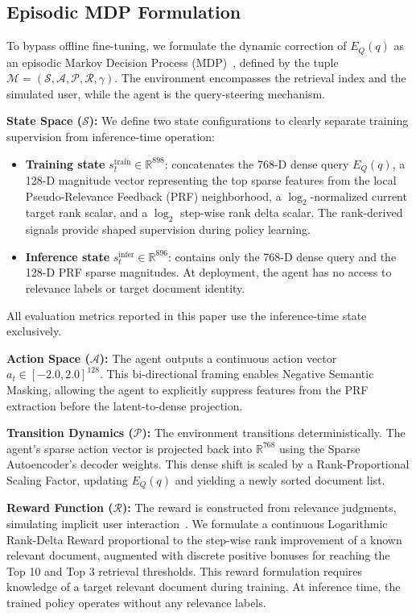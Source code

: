 \documentclass[sigconf]{acmart}
\begin{document}
\subsection{Episodic MDP Formulation}

To bypass offline fine-tuning, we formulate the dynamic correction of $E_Q(q)$ as an episodic Markov Decision Process (MDP)~\cite{sutton2018}, defined by the tuple $\mathcal{M} = (\mathcal{S}, \mathcal{A}, \mathcal{P}, \mathcal{R}, \gamma)$. The environment encompasses the retrieval index and the simulated user, while the agent is the query-steering mechanism.

\textbf{State Space ($\mathcal{S}$):} We define two state configurations to clearly separate training supervision from inference-time operation:

\begin{itemize}
\item \textbf{Training state} $s_t^{\text{train}} \in \mathbb{R}^{898}$: concatenates the 768-D dense query $E_Q(q)$, a 128-D magnitude vector representing the top sparse features from the local Pseudo-Relevance Feedback (PRF) neighborhood, a $\log_2$-normalized current target rank scalar, and a $\log_2$ step-wise rank delta scalar. The rank-derived signals provide shaped supervision during policy learning.
\item \textbf{Inference state} $s_t^{\text{infer}} \in \mathbb{R}^{896}$: contains only the 768-D dense query and the 128-D PRF sparse magnitudes. At deployment, the agent has no access to relevance labels or target document identity.
\end{itemize}

All evaluation metrics reported in this paper use the inference-time state exclusively.

\textbf{Action Space ($\mathcal{A}$):} The agent outputs a continuous action vector $a_t \in [-2.0, 2.0]^{128}$. This bi-directional framing enables Negative Semantic Masking, allowing the agent to explicitly suppress features from the PRF extraction before the latent-to-dense projection.

\textbf{Transition Dynamics ($\mathcal{P}$):} The environment transitions deterministically. The agent's sparse action vector is projected back into $\mathbb{R}^{768}$ using the Sparse Autoencoder's decoder weights. This dense shift is scaled by a Rank-Proportional Scaling Factor, updating $E_Q(q)$ and yielding a newly sorted document list.

\textbf{Reward Function ($\mathcal{R}$):} The reward is constructed from relevance judgments, simulating implicit user interaction~\cite{joachims2002}. We formulate a continuous Logarithmic Rank-Delta Reward proportional to the step-wise rank improvement of a known relevant document, augmented with discrete positive bonuses for reaching the Top 10 and Top 3 retrieval thresholds. This reward formulation requires knowledge of a target relevant document during training. At inference time, the trained policy operates without any relevance labels.
\end{document}
